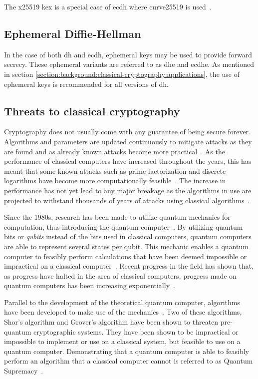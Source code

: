 The \gls{x25519} \gls{kex} is a special case of \gls{ecdh} where \gls{curve25519} is used~\cite{rfc7748}. 

\subsection{Ephemeral Diffie-Hellman}

In the case of both \gls{dh} and \gls{ecdh}, ephemeral keys may be used to provide forward secrecy. These ephemeral variants are referred to as \gls{dhe} and \gls{ecdhe}. As mentioned in section \ref{section:background:classical-cryptography:applications}, the use of ephemeral keys is recommended for all versions of \gls{dh}.

\subsection{Threats to classical cryptography}
\label{section:background:classical-cryptography-threats}

Cryptography does not usually come with any guarantee of being secure forever. Algorithms and parameters are updated continuously to mitigate attacks as they are found and as already known attacks become more practical~\cite{nist2019}. As the performance of classical computers have increased throughout the years, this has meant that some known attacks such as prime factorization and discrete logarithms have become more computationally feasible~\cite{theis2017}. The increase in performance has not yet lead to any major breakage as the algorithms in use are projected to withstand thousands of years of attacks using classical algorithms~\cite{thome2019}.

Since the 1980s, research has been made to utilize quantum mechanics for computation, thus introducing the quantum computer~\cite{benioff1980}. By utilizing quantum bits or \textit{\glspl{qubit}} instead of the bits used in classical computers, quantum computers are able to represent several states per \gls{qubit}. This mechanic enables a quantum computer to feasibly perform calculations that have been deemed impossible or impractical on a classical computer~\cite{jordan2021}. Recent progress in the field has shown that, as progress have halted in the area of classical computers, progress made on quantum computers has been increasing exponentially~\cite{ibm2020:quantum-computer}.

Parallel to the development of the theoretical quantum computer, algorithms have been developed to make use of the mechanics~\cite{shor1997, jordan2021}. Two of these algorithms, Shor's algorithm and Grover's algorithm have been shown to threaten pre-quantum cryptographic systems. They have been shown to be impractical or impossible to implement or use on a classical system, but feasible to use on a quantum computer. Demonstrating that a quantum computer is able to feasibly perform an algorithm that a classical computer cannot is referred to as Quantum Supremacy~\cite{farhi2019}.

